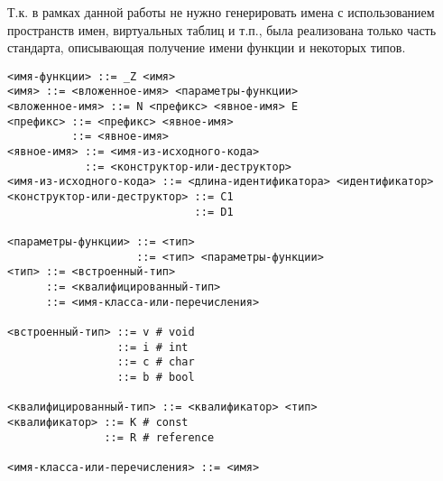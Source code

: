 Т.к. в рамках данной работы не нужно генерировать имена с использованием
пространств имен, виртуальных таблиц и т.п., была реализована только часть
стандарта, описывающая получение имени функции и некоторых типов.

\begin{verbatim}
<имя-функции> ::= _Z <имя>
<имя> ::= <вложенное-имя> <параметры-функции>
<вложенное-имя> ::= N <префикс> <явное-имя> E
<префикс> ::= <префикс> <явное-имя>
          ::= <явное-имя>
<явное-имя> ::= <имя-из-исходного-кода>
            ::= <конструктор-или-деструктор>
<имя-из-исходного-кода> ::= <длина-идентификатора> <идентификатор>
<конструктор-или-деструктор> ::= С1
                             ::= D1

<параметры-функции> ::= <тип>
                    ::= <тип> <параметры-функции>
<тип> ::= <встроенный-тип>
      ::= <квалифицированный-тип>
      ::= <имя-класса-или-перечисления>

<встроенный-тип> ::= v # void
                 ::= i # int
                 ::= c # char
                 ::= b # bool

<квалифицированный-тип> ::= <квалификатор> <тип>
<квалификатор> ::= K # const
               ::= R # reference

<имя-класса-или-перечисления> ::= <имя>
\end{verbatim}

